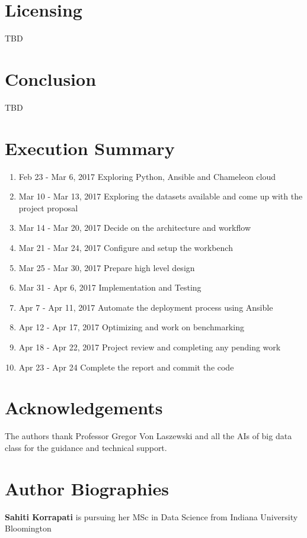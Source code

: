 \documentclass[9pt,twocolumn,twoside]{styles/osajnl}
\begin{document}
\section{Licensing}
TBD

\section{Conclusion}
TBD

\section{Execution Summary}
\begin{enumerate}
    \item{Feb 23 - Mar 6, 2017} Exploring Python, Ansible and Chameleon cloud
    \item{Mar 10 - Mar 13, 2017} Exploring the datasets available and come up with the project proposal
    \item{Mar 14 - Mar 20, 2017} Decide on the architecture and workflow
    \item{Mar 21 - Mar 24, 2017} Configure and setup the workbench
    \item{Mar 25 - Mar 30, 2017} Prepare high level design
    \item{Mar 31 - Apr 6, 2017} Implementation and Testing
    \item{Apr 7 - Apr 11, 2017} Automate the deployment process using Ansible
    \item{Apr 12 - Apr 17, 2017} Optimizing and work on benchmarking
    \item{Apr 18 - Apr 22, 2017} Project review and completing any pending work
    \item{Apr 23 - Apr 24} Complete the report and commit the code
\end{enumerate}

\section*{Acknowledgements}

The authors thank Professor Gregor Von Laszewski and all the AIs of big data class for the guidance and technical support.


 
\section*{Author Biographies}
\begingroup
\setlength\intextsep{0pt}
\begin{minipage}[t][3.2cm][t]{1.0\columnwidth} %
  \noindent
  {\bfseries Sahiti Korrapati} is pursuing her MSc in Data Science from
  Indiana University Bloomington
\end{minipage}
\endgroup
\end{document}
